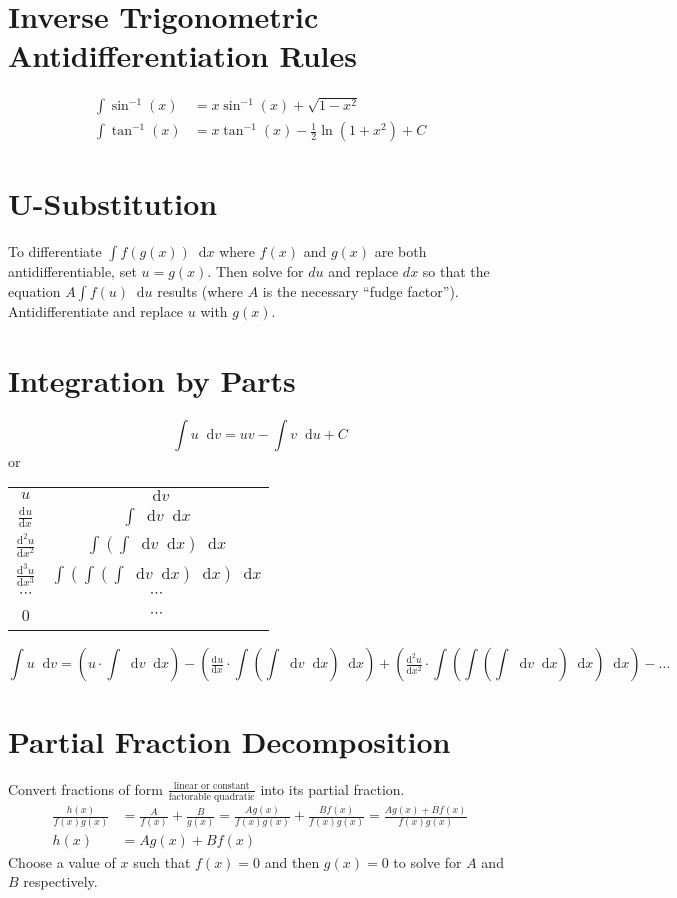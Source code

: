 \documentclass[12pt]{article}
\newcommand*{\rmaskip}{\setlength{\abovedisplayskip}{0pt}}
\newcommand*{\rmbskip}{\setlength{\belowdisplayskip}{0pt}}
\newcommand*{\rmskip}{\rmaskip \rmbskip}
\newcommand*{\dd}[3][]{\tfrac{\mathrm{d}^{#1}#2}{\mathrm{d}#3^{#1}}}
\newcommand*{\D}[1]{\mathop{}\!\mathrm{d} #1}
\begin{document}
\section*{Inverse Trigonometric Antidifferentiation Rules}
{\rmskip\begin{align*}
  \int \sin^{-1}(x) &= x\sin^{-1}(x) + \sqrt{1-x^2}\\
  \int \tan^{-1}(x) &= x\tan^{-1}(x) - \frac{1}{2} \ln(1 + x^2) + C
\end{align*}}%
\section*{U-Substitution}
To differentiate \(\int f(g(x)) \D{x}\) where \(f(x)\) and \(g(x)\) are both
antidifferentiable, set \(u = g(x)\). Then solve for \(du\) and replace \(dx\)
so that the equation \(A\int f(u) \D{u}\) results (where \(A\) is the necessary
``fudge factor''). Antidifferentiate and replace \(u\) with \(g(x)\).
\section*{Integration by Parts}
\[
  \int u \D{v} = uv - \int v \D{u} + C
\]
or\\
{\renewcommand{\arraystretch}{1.5}\begin{tabular}{c c}
  \(u\) & \(\D{v}\)\\
  \(\dd{u}{x}\) & \(\int \D{v} \D{x}\)\\
  \(\dd[2]{u}{x}\) & \(\int\left(\int\D{v}\D{x}\right)\D{x}\)\\
  \(\dd[3]{u}{x}\) & \(\int\left(\int\left(\int\D{v}\D{x}\right)\D{x}
    \right)\D{x}\)\\
  \(\cdots\) & \(\cdots\)\\
  0 & \(\cdots\)
\end{tabular}}
\[
  \int u \D{v} = \left(u \cdot \int \D{v} \D{x}\right) - \left(
    \dd{u}{x} \cdot \int \left( \int \D{v} \D{x} \right) \D{x}
    \right) + \left(\dd[2]{u}{x} \cdot \int \left( \int \left( \int \D{v}
    \D{x} \right) \D{x} \right) \D{x} \right) - \dots
\]
\section*{Partial Fraction Decomposition}
Convert fractions of form \(\frac{\text{linear or constant}}{\text{factorable
quadratic}}\) into its partial fraction.
\begin{align*}
  \frac{h(x)}{f(x)g(x)} &= \frac{A}{f(x)} + \frac{B}{g(x)} = \frac{Ag(x)}
  {f(x)g(x)} + \frac{Bf(x)}{f(x)g(x)} = \frac{Ag(x) + Bf(x)}{f(x)g(x)}\\
  h(x) &= Ag(x) + Bf(x)
\end{align*}
Choose a value of \(x\) such that \(f(x) = 0\) and then \(g(x) = 0\) to solve
for \(A\) and \(B\) respectively.
\end{document}
